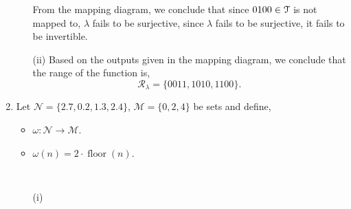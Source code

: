 \documentclass[12pt]{article} %
\begin{document}
\begin{qstn}
\begin{enumerate}[label=(\alph*)]
\begin{solution}
\begin{enumerate}[label=(\alph*)]
\begin{center}
\begin{tikzpicture}
          \end{tikzpicture}
        \end{center}
        From the mapping diagram, we conclude that since $0100 \in \EuScript{T}$ is not mapped to, $\lambda$ fails
        to be surjective, since  $\lambda$ fails to be surjective, it fails to be invertible.

      \item[(ii)] Based on the outputs given in the mapping diagram, we conclude that the range of the function is,
        \[
            \mathcal{R}_\lambda = \{0011,1010,1100\} 
        .\] 
    \end{enumerate}
  \end{solution}





  \item Let $\mathcal{N} = \{2.7,0.2,1.3,2.4\} $, $\mathcal{M} = \{0,2,4\}$ be sets and define,
    \begin{itemize}
      \item $\omega \colon \mathcal{N} \to \mathcal{M}$.
      \item $\omega(n) = 2\cdot \operatorname{floor}(n)$.
    \end{itemize}

  \begin{solution} \texttt{  }
    \begin{enumerate}[label=(\alph*)]
      \item[(i)] \texttt{  }
          \begin{center}
\end{center}
\end{enumerate}
\end{solution}
\end{enumerate}
\end{qstn}
\end{document}
